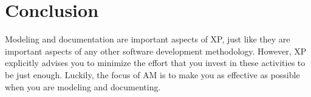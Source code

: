 \section{Conclusion}
Modeling and documentation are important aspects of XP, just like they are
important aspects of any other software development methodology. However, XP
explicitly advises you to minimize the effort that you invest in these
activities to be just enough. Luckily, the focus of AM is to make you as
effective as possible when you are modeling and documenting.